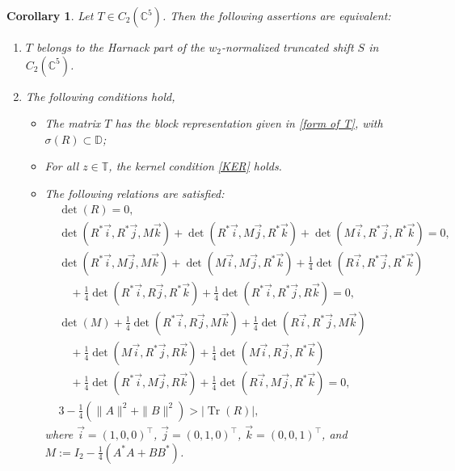 \documentclass[12pt, reqno]{amsart}
\newtheorem{corollary}[theorem]{Corollary}
\theoremstyle{definition}
\theoremstyle{remark}
\numberwithin{equation}{section}
\begin{document}
\begin{corollary}\label{Corollary2}
	Let $T \in C_2(\mathbb{C}^{5})$. Then the following assertions are equivalent:  
	\begin{enumerate}
		\item[(i)] $T$ belongs to the Harnack part of the $w_2$-normalized truncated shift $S$ in $C_2(\mathbb{C}^{5})$.
		\item[(ii)] The following conditions hold,
		\begin{itemize}
			\item[(a)] The matrix $T$ has the block representation given in \eqref{form of T}, with $\sigma(R)\subset \mathbb{D}$;  
			\item[(b)] For all $z\in \mathbb{T}$, the kernel condition \eqref{KER} holds.
			\item[(c)] The following relations are satisfied:
			\begin{align}
				&\det(R) = 0, \label{p1}\\	
				&\det\left( R^*\vec{i}, R^*\vec{j}, M\vec{k}\right) + \det\left( R^*\vec{i}, M\vec{j}, R^*\vec{k}\right) + \det\left( M\vec{i}, R^*\vec{j}, R^*\vec{k}\right) = 0, \label{p2}\\
				&\det\left( R^*\vec{i}, M\vec{j}, M\vec{k}\right) + \det\left( M\vec{i}, M\vec{j}, R^*\vec{k}\right) + \frac{1}{4}\det\left( R\vec{i}, R^*\vec{j}, R^*\vec{k}\right) \nonumber\\
				&\quad + \frac{1}{4}\det\left( R^*\vec{i}, R\vec{j}, R^*\vec{k}\right) + \frac{1}{4}\det\left( R^*\vec{i}, R^*\vec{j}, R\vec{k}\right) = 0, \label{p3}\\
				&\det(M) + \frac{1}{4}\det\left( R^*\vec{i}, R\vec{j}, M\vec{k}\right) + \frac{1}{4}\det\left( R\vec{i}, R^*\vec{j}, M\vec{k}\right) \nonumber\\
				&\quad + \frac{1}{4}\det\left( M\vec{i}, R^*\vec{j}, R\vec{k}\right) + \frac{1}{4}\det\left(M \vec{i}, R\vec{j}, R^*\vec{k}\right) \nonumber\\
				&\quad + \frac{1}{4}\det\left( R^*\vec{i}, M\vec{j}, R\vec{k}\right) + \frac{1}{4}\det\left( R\vec{i}, M\vec{j}, R^*\vec{k}\right) = 0, \label{p4}\\
				&3 - \frac{1}{4}\left( \| A \|^2 + \| B \|^2 \right) > | \operatorname{Tr}(R)|, \label{p5}
			\end{align}
			where $\vec{i} = (1, 0, 0)^\top$, $\vec{j} = (0, 1, 0)^\top$, $\vec{k} = (0, 0, 1)^\top$, and $M := I_{2} - \frac{1}{4}(A^*A + BB^*)$.
		\end{itemize}
	\end{enumerate}
\end{corollary}
\end{document}
